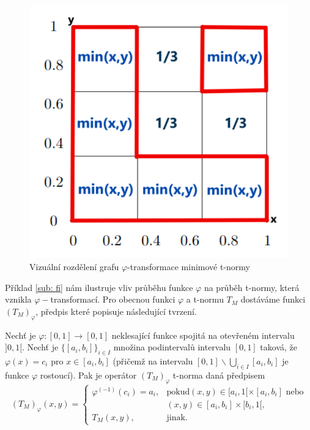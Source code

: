 \begin{figure}[H]
\caption{ Vizu\' aln\' i rozd\v elen\'i grafu $\varphi$-transformace minimov\' e t-normy\\}
                \hspace{-1cm}
                \includegraphics[scale=0.70]{template-fig/phi-tnorm.pdf}
                \centering
            \end{figure}


    
Příklad \ref{sub: fi} nám ilustruje vliv průběhu funkce $\varphi$ na průběh t-normy, která vznikla $\varphi-$transformací. Pro obecnou funkci $\varphi$ a t-normu $T_M$ dostáváme funkci $(T_M)_{\varphi}$, předpis které popisuje následující tvrzení.
\begin{sentence}
\cite{mitav}
\label{t-norm}
 Nech\v t je $\varphi:[0,1]\rightarrow [0,1]$
neklesající funkce spojitá na otevřeném intervalu $]0,1[$.
Nech\v t je $\{[a_i,b_i]\}_{i\in I}$ množina podinterval\r u
intervalu $[0,1]$ taková, že $\varphi(x)=c_i$ pro $x\in
[a_i,b_i]$ (přičemž na intervalu $[0,1]\backslash \bigcup \limits_{i \in I}
[a_i,b_i]$ je funkce $\varphi$
rostoucí).
Pak je operátor $(T_M)_{\varphi}$  t-norma daná předpisem
$$ (T_M)_{\varphi}(x,y) = \begin{cases} \varphi^{(-1)}(c_i)=a_i, &\mbox {pokud
$(x,y)\in [a_i,1[\times[a_i,b_i]$ nebo}
\\ & (x,y)\in [a_i,b_i]\times[b_i,1[,
\\ T_M(x,y), &\mbox {jinak.}
\end{cases} $$
\end{sentence}

